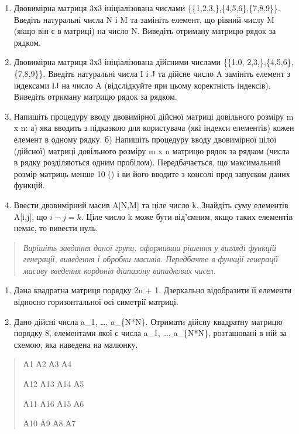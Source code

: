 \documentclass[]{article}
\begin{document}
\begin{enumerate}
\def\labelenumi{\arabic{enumi})}
\item
  Двовимірна матриця 3х3 ініціалізована числами
  \{\{1,2,3,\},\{4,5,6\},\{7,8,9\}\}. Введіть
  натуральні числа N і M та замініть елемент, що рівний числу M (якщо
  він є в матриці) на число N. Виведіть отриману матрицю рядок за
  рядком.
\item
  Двовимірна матриця 3х3 ініціалізована дійсними числами \{\{1.0,
  2,3,\},\{4,5,6\},\{7,8,9\}\}. Введіть натуральні числа I і J та дійсне число A замініть елемент з індексами
  IJ на число A (відслідкуйте при цьому коректність індексів). Виведіть
  отриману матрицю рядок за рядком.
\item
  Напишіть процедуру вводу двовимірної дійсної матриці довільного
  розміру m x n:
  а) яка вводить з підказкою для користувача (які індекси
  елементів) кожен елемент в одному рядку.
  б) Напишіть процедуру вводу двовимірної цілої (дійсної) матриці
  довільного розміру m x n матрицю рядок за рядком (числа в рядку
  розділяються одним пробілом).
  Передбачається, що максимальний розмір матриць менше 10 () і ви його вводите з консолі пред запуском даних функцій. 

\item
  Ввести двовимірний масив A{[}N,M{]} та ціле число k. Знайдіть суму елементів A{[}i,j{]},
  що $i-j=k$. Ціле число k може бути від'ємним, якщо таких елементів
  немає, то вивести нуль.
\end{enumerate}

\begin{quote}
\emph{\emph{Вирішіть завдання даної групи, оформивши рішення у вигляді
функцій генерації, виведення і обробки масивів. Передбачте в функції
генерації масиву введення кордонів діапазону випадкових чисел.}}
\end{quote}

\begin{enumerate}
\def\labelenumi{\arabic{enumi})}
\item
  Дана квадратна матриця порядку 2n + 1. Дзеркально відобразити її
  елементи відносно горизонтальної осі симетрії матриці.
\item
  Дано дійсні числа a\_1, \ldots{}, a\_\{N*N\}. Отримати дійсну
  квадратну матрицю порядку 8, елементами якої є числа a\_1, \ldots{},
  a\_\{N*N\}, розташовані в ній за схемою, яка наведена на малюнку.
\end{enumerate}

\begin{quote}
А1 А2 А3 А4

А12 А13 А14 А5

А11 А16 А15 А6

А10 А9 А8 А7
\end{quote}
\end{document}
